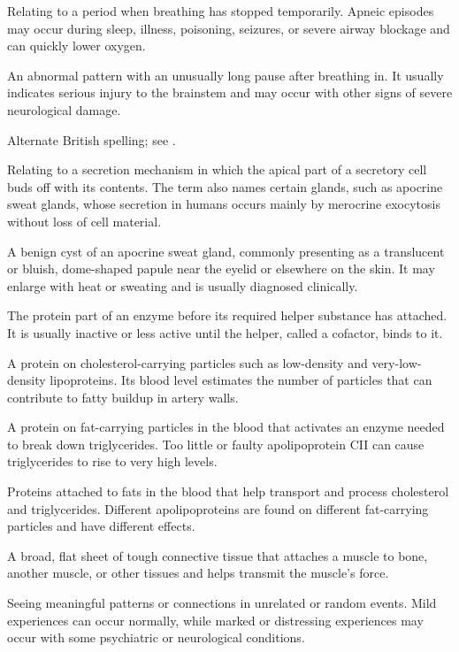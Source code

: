  Relating to a period when breathing has stopped temporarily. Apneic episodes may occur during sleep, illness, poisoning, seizures, or severe airway blockage and can quickly lower oxygen.

 An abnormal pattern with an unusually long pause after breathing in. It usually indicates serious injury to the brainstem and may occur with other signs of severe neurological damage.

 Alternate British spelling; see .

 Relating to a secretion mechanism in which the apical part of a secretory cell buds off with its contents. The term also names certain glands, such as apocrine sweat glands, whose secretion in humans occurs mainly by merocrine exocytosis without loss of cell material.

 A benign cyst of an apocrine sweat gland, commonly presenting as a translucent or bluish, dome-shaped papule near the eyelid or elsewhere on the skin. It may enlarge with heat or sweating and is usually diagnosed clinically.

 The protein part of an enzyme before its required helper substance has attached. It is usually inactive or less active until the helper, called a cofactor, binds to it.

 A protein on cholesterol-carrying particles such as low-density and very-low-density lipoproteins. Its blood level estimates the number of particles that can contribute to fatty buildup in artery walls.

 A protein on fat-carrying particles in the blood that activates an enzyme needed to break down triglycerides. Too little or faulty apolipoprotein CII can cause triglycerides to rise to very high levels.

 Proteins attached to fats in the blood that help transport and process cholesterol and triglycerides. Different apolipoproteins are found on different fat-carrying particles and have different effects.

 A broad, flat sheet of tough connective tissue that attaches a muscle to bone, another muscle, or other tissues and helps transmit the muscle’s force.

 Seeing meaningful patterns or connections in unrelated or random events. Mild experiences can occur normally, while marked or distressing experiences may occur with some psychiatric or neurological conditions.

